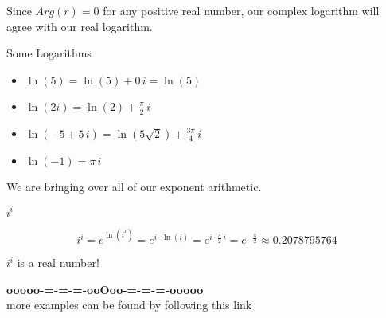 \documentclass{ximera}
\begin{document}
Since $Arg(r) = 0$ for any positive real number, our complex logarithm will agree with our real logarithm.








\begin{example} Some Logarithms


\begin{itemize}
\item $\ln(5) = \ln(5) + 0 \, i = \ln(5)$

\item $\ln(2i) = \ln(2) + \frac{\pi}{2} \, i$

\item $\ln(-5 + 5 \, i) = \ln(5 \sqrt{2}) + \frac{3\pi}{4}\, i$

\item $\ln(-1) = \pi \, i$



\end{itemize}




\end{example}







We are bringing over all of our exponent arithmetic.



\begin{example}  $i^i$


\[    i^i =  e^{\ln(i^i)} = e^{i \cdot \ln(i)} = e^{ i \cdot \tfrac{\pi}{2} \, i}   = e^{-\tfrac{\pi}{2}} \approx  0.2078795764\]



\begin{center}

$i^i$ is a real number!
\end{center}


\end{example}




























\begin{center}
\textbf{\textcolor{green!50!black}{ooooo-=-=-=-ooOoo-=-=-=-ooooo}} \\

more examples can be found by following this link\\ 

\end{center}
\end{document}
